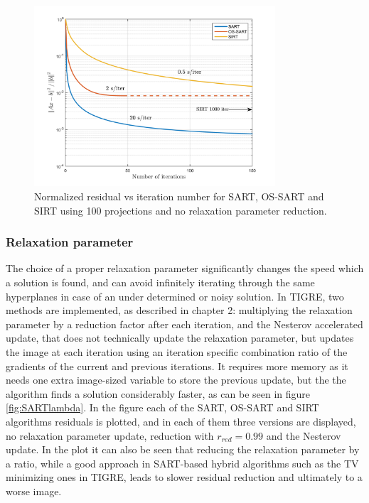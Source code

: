 \begin{figure}[H]
\begin{center}

\includegraphics[width=0.8\textwidth]{Applications/SARTtypes.png} 
\end{center}

\caption[Nomralized residual vs iteration of SART/OS-SART/SIRT]{\label{fig:SARTtypesconv} Normalized residual vs iteration number for SART, OS-SART and SIRT using 100 projections and no relaxation parameter reduction.} 
\end{figure}

\subsubsection{Relaxation parameter}
The choice of a proper relaxation parameter significantly changes the speed which a solution is found, and can avoid infinitely iterating through the same hyperplanes in case of an under determined or noisy solution. In TIGRE, two methods are implemented, as described in chapter 2: multiplying the relaxation parameter by a reduction factor after each iteration, and the Nesterov accelerated update, that does not technically update the relaxation parameter, but updates the image at each iteration using an iteration specific combination ratio of the gradients of the current and previous iterations. It requires more memory as it needs one extra image-sized variable to store the previous update, but the the algorithm finds a solution considerably faster, as can be seen in figure \ref{fig:SARTlambda}. In the figure each of the SART, OS-SART and SIRT algorithms residuals is plotted, and in each of them three versions are displayed, no relaxation parameter update, reduction with $r_{red}=0.99$ and the Nesterov update. In the plot it can also be seen that reducing the relaxation parameter by a ratio, while a good approach in SART-based hybrid algorithms such as the TV minimizing ones in TIGRE, leads to slower residual reduction and ultimately to a worse image.

